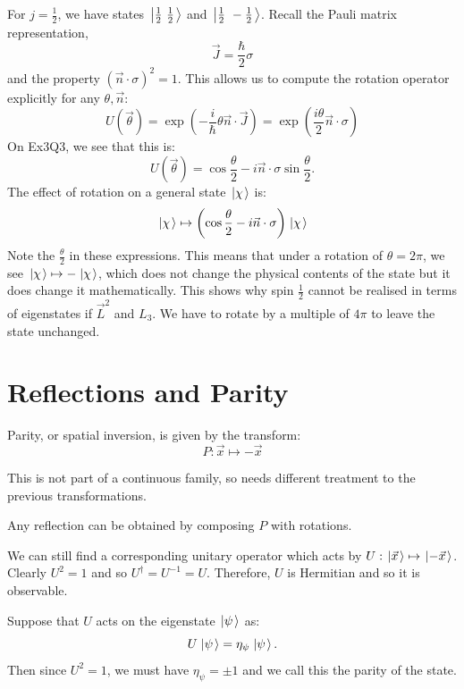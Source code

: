 \documentclass[../Main.tex]{subfiles}
\begin{document}
For $j = \frac12$, we have states $\left.\left|\frac12~\frac12\right.\right\rangle$ and $\left.\left|\frac12~-\frac12\right.\right\rangle$. Recall the Pauli matrix representation,
\begin{equation*}
    \vec J = \frac\hbar2\sigma
\end{equation*}
and the property $(\vec{n} \cdot \sigma)^2 = 1$. This allows us to compute the rotation operator explicitly for any $\theta, \vec n$:
\begin{equation*}
    U(\vec\theta) = \exp\left(-\frac i \hbar \theta \vec{n} \cdot \vec{J}\right) = \exp\left(\frac{i\theta}{2} \vec{n} \cdot \sigma\right)
\end{equation*}
On Ex3Q3, we see that this is:
\begin{equation*}
    U(\vec\theta) = \cos\frac\theta2 - i \vec{n} \cdot \sigma \sin\frac\theta2.
\end{equation*}
The effect of rotation on a general state $\left.\left|\chi\right.\right\rangle$ is:
\begin{equation*}
    \left.\left|\chi\right.\right\rangle \mapsto \left(\cos\frac\theta2 - i \vec{n} \cdot \sigma\right) \left.\left|\chi\right.\right\rangle
\end{equation*}
Note the $\frac\theta2$ in these expressions. This means that under a rotation of $\theta = 2\pi$, we see $\left.\left|\chi\right.\right\rangle \mapsto -\left.\left|\chi\right.\right\rangle$, which does not change the physical contents of the state but it does change it mathematically. This shows why spin $\frac12$ cannot be realised in terms of eigenstates if $\vec L^2$ and $L_3$. We have to rotate by a multiple of $4\pi$ to leave the state unchanged.
\section{Reflections and Parity}
Parity, or spatial inversion, is given by the transform:
\begin{equation*}
    P : \vec x \mapsto -\vec x
\end{equation*}
\begin{remarks}
    \item This is not part of a continuous family, so needs different treatment to the previous transformations.
    \item Any reflection can be obtained by composing $P$ with rotations.
\end{remarks}
We can still find a corresponding unitary operator which acts by $U : \left.\left|\vec x\right.\right\rangle \mapsto \left.\left|-\vec x\right.\right\rangle$. Clearly $U^2 = 1$ and so $U^\dagger = U^{-1} = U$. Therefore, $U$ is Hermitian and so it is observable.

Suppose that $U$ acts on the eigenstate $\left.\left|\psi\right.\right\rangle$ as:
\begin{equation*}
    U\left.\left|\psi\right.\right\rangle = \eta_\psi \left.\left|\psi\right.\right\rangle.
\end{equation*}
Then since $U^2 = 1$, we must have $\eta_\psi = \pm 1$ and we call this the parity of the state.
\end{document}
